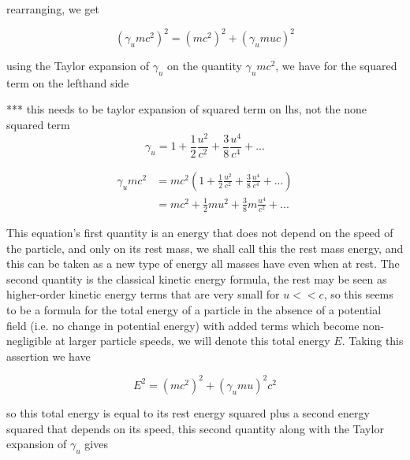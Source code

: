 rearranging, we get

\begin{equation}
	\label{eq: total relativistic energy}
	\left( \gamma_{u} m {c}^2 \right)^2 = ({m}{c}^2)^2 + \left( \gamma_{u} {m}{u}{c}\right)^2
\end{equation}

using the Taylor expansion of $\gamma_{u}$ on the quantity $\gamma_{u} {m}{c}^2$, we have for the squared term on the lefthand side

*** this needs to be taylor expansion of squared term on lhs, not the none squared term
\begin{equation}
	\gamma_{u} = 1 + \frac{1}{2}\frac{u^2}{{c}^2} + \frac{3}{8}\frac{u^4}{c^4} + ...
\end{equation}

\begin{equation}
	\begin{aligned}
		\gamma_{u} {m}{c}^2 & = {m}{c}^2  \left(1 + \frac{1}{2}\frac{u^2}{{c}^2} + \frac{3}{8}\frac{u^4}{c^4} + ...
		\right)                                                                                                     \\
		                    & = {m}{c}^2 + \frac{1}{2}{m}{u}^2 + \frac{3}{8}m\frac{u^4}{{c}^2} + ...
	\end{aligned}
\end{equation}

This equation's first quantity is an energy that does not depend on the speed of the particle, and only on its rest mass, we shall call this the rest mass energy, and this can be taken as a new type of energy all masses have even when at rest.
The second quantity is the classical kinetic energy formula, the rest may be seen as higher-order kinetic energy terms that are very small for ${u}<<{c}$, so this seems to be a formula for the total energy of a particle in the absence of a potential field (i.e.
no change in potential energy) with added terms which become non-negligible at larger particle speeds, we will denote this total energy ${E}$.
Taking this assertion we have

\begin{equation}
	E^2 = \left( {m}{c}^2 \right)^2 + (\gamma_{u}{m}{u})^2{c}^2
\end{equation}

so this total energy is equal to its rest energy squared plus a second energy squared that depends on its speed, this second quantity along with the Taylor expansion of $\gamma_{u}$ gives


